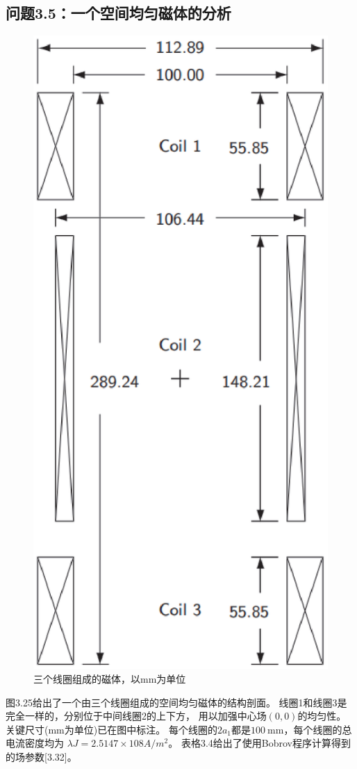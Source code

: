\subsection{问题3.5：一个空间均匀磁体的分析}
\begin{figure}[htbp]
	\centering
	\includegraphics[scale=0.5]{chpt3/figs/fig3.25.eps}
	\caption{三个线圈组成的磁体，以mm为单位}
\end{figure}
图3.25给出了一个由三个线圈组成的空间均匀磁体的结构剖面。
线圈1和线圈3是完全一样的，分别位于中间线圈2的上下方，
用以加强中心场$(0,0)$的均匀性。
关键尺寸(mm为单位)已在图中标注。
每个线圈的$2a_1$都是$100\ \mathrm{mm}$，每个线圈的总电流密度均为
$\lambda J =2.5147×108 A/m^2$。
表格3.4给出了使用Bobrov程序计算得到的场参数[3.32]。


